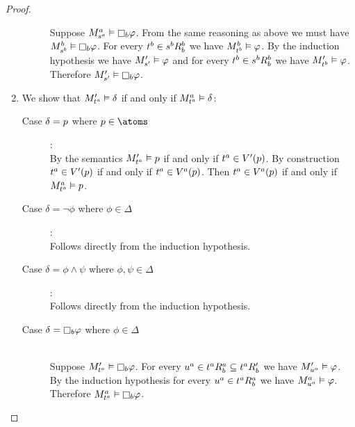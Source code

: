 \begin{proof}
\begin{enumerate}
\begin{description}
                Suppose $\kPModel[\agentA]{\kStateS[\agentA]} \entails \necessaryB \phi$.
                From the same reasoning as above we must have $\kPModel[\agentB]{\kStateS[\agentB]} \entails \necessaryB \phi$.
                For every $\kStateT[\agentB] \in \kSuccessorsB[\agentB]{\kStateS[\agentB]}$ we have $\kPModel[\agentB]{\kStateT[\agentB]} \entails \phi$.
                By the induction hypothesis we have $\kPModelP{\kStateSP} \entails \phi$ and for every $\kStateT[\agentB] \in \kSuccessorsB[\agentB]{\kStateS[\agentB]}$ we have $\kPModelP{\kStateT[\agentB]} \entails \phi$.
                Therefore $\kPModelP{\kStateSP} \entails \necessaryB \phi$.
        \end{description}
    \item We show that $\kPModelP{\kStateT[\agentA]} \entails \delta$ if and only if $\kPModel[\agentA]{\kStateT[\agentA]} \entails \delta$:
        \begin{description}
            \item[Case $\delta = \atomP$ where $\atomP \in \atoms$]:
                \hfill\\
                By the semantics $\kPModelP{\kStateT[\agentA]} \entails \atomP$ if and only if $\kStateT[\agentA] \in \kValuationP(\atomP)$.
                By construction $\kStateT[\agentA] \in \kValuationP(\atomP)$ if and only if $\kStateT[\agentA] \in \kValuation[\agentA](\atomP)$.
                Then $\kStateT[\agentA] \in \kValuation[\agentA](\atomP)$ if and only if $\kPModel[\agentA]{\kStateT[\agentA]} \entails \atomP$.
            \item[Case $\delta = \lnot \phi$ where $\phi \in \Delta$]:
                \hfill\\
                Follows directly from the induction hypothesis.
            \item[Case $\delta = \phi \land \psi$ where $\phi, \psi \in \Delta$]:
                \hfill\\
                Follows directly from the induction hypothesis.
            \item[Case $\delta = \necessaryB \phi$ where $\phi \in \Delta$]
                \hfill\\
                Suppose $\kPModelP{\kStateT[\agentA]} \entails \necessaryB \phi$.
                For every $\kStateU[\agentA] \in \kSuccessorsB[\agentA]{\kStateT[\agentA]} \subseteq \kSuccessorsPB{\kStateT[\agentA]}$ we have $\kPModelP{\kStateU[\agentA]} \entails \phi$.
                By the induction hypothesis for every $\kStateU[\agentA] \in \kSuccessorsB[\agentA]{\kStateT[\agentA]}$ we have $\kPModel[\agentA]{\kStateU[\agentA]} \entails \phi$.
                Therefore $\kPModel[\agentA]{\kStateT[\agentA]} \entails \necessaryB \phi$.


\end{description}
\end{enumerate}
\end{proof}

